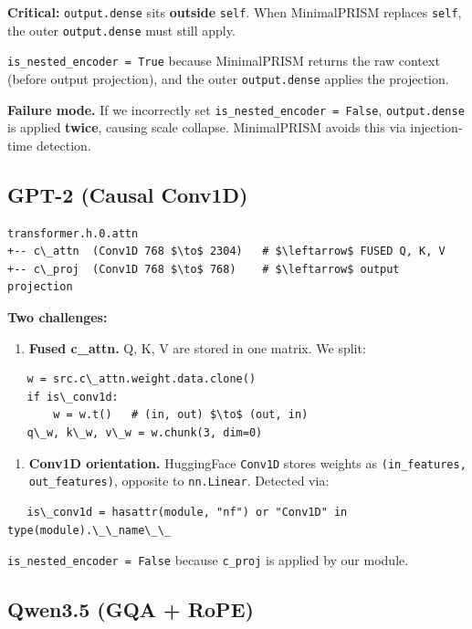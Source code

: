 \textbf{Critical:} \texttt{output.dense} sits \textbf{outside} \texttt{self}. When MinimalPRISM 
replaces \texttt{self}, the outer \texttt{output.dense} must still apply.

\texttt{is\_nested\_encoder = True} because MinimalPRISM returns the raw context 
(before output projection), and the outer \texttt{output.dense} applies the 
projection.

\textbf{Failure mode.} If we incorrectly set \texttt{is\_nested\_encoder = False}, 
\texttt{output.dense} is applied \textbf{twice}, causing scale collapse. MinimalPRISM 
avoids this via injection-time detection.

\subsection{GPT-2 (Causal Conv1D)}

\begin{lstlisting}
transformer.h.0.attn
+-- c\_attn  (Conv1D 768 $\to$ 2304)   # $\leftarrow$ FUSED Q, K, V
+-- c\_proj  (Conv1D 768 $\to$ 768)    # $\leftarrow$ output projection
\end{lstlisting}

\textbf{Two challenges:}

\begin{enumerate}
\item \textbf{Fused c\_attn.} Q, K, V are stored in one matrix. We split:
\end{enumerate}
\begin{lstlisting}
   w = src.c\_attn.weight.data.clone()
   if is\_conv1d:
       w = w.t()   # (in, out) $\to$ (out, in)
   q\_w, k\_w, v\_w = w.chunk(3, dim=0)
\end{lstlisting}

\begin{enumerate}
\item \textbf{Conv1D orientation.} HuggingFace \texttt{Conv1D} stores weights as
  \texttt{(in\_features, out\_features)}, opposite to \texttt{nn.Linear}. Detected via:
\end{enumerate}
\begin{lstlisting}
   is\_conv1d = hasattr(module, "nf") or "Conv1D" in type(module).\_\_name\_\_
\end{lstlisting}

\texttt{is\_nested\_encoder = False} because \texttt{c\_proj} is applied by our module.

\subsection{Qwen3.5 (GQA + RoPE)}

